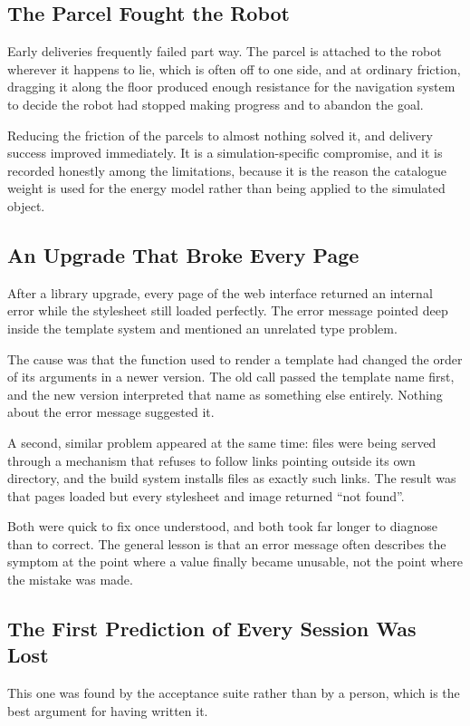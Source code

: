 \documentclass[12pt,a4paper]{report}
\begin{document}
\subsection{The Parcel Fought the Robot}
Early deliveries frequently failed part way. The parcel is attached to the robot wherever it happens
to lie, which is often off to one side, and at ordinary friction, dragging it along the floor
produced enough resistance for the navigation system to decide the robot had stopped making progress
and to abandon the goal.

Reducing the friction of the parcels to almost nothing solved it, and delivery success improved
immediately. It is a simulation-specific compromise, and it is recorded honestly among the
limitations, because it is the reason the catalogue weight is used for the energy model rather than
being applied to the simulated object.

\subsection{An Upgrade That Broke Every Page}
After a library upgrade, every page of the web interface returned an internal error while the
stylesheet still loaded perfectly. The error message pointed deep inside the template system and
mentioned an unrelated type problem.

The cause was that the function used to render a template had changed the order of its arguments in
a newer version. The old call passed the template name first, and the new version interpreted that
name as something else entirely. Nothing about the error message suggested it.

A second, similar problem appeared at the same time: files were being served through a mechanism
that refuses to follow links pointing outside its own directory, and the build system installs files
as exactly such links. The result was that pages loaded but every stylesheet and image returned
``not found''.

Both were quick to fix once understood, and both took far longer to diagnose than to correct. The
general lesson is that an error message often describes the symptom at the point where a value
finally became unusable, not the point where the mistake was made.

\subsection{The First Prediction of Every Session Was Lost}
\label{sec:coldstart}
This one was found by the acceptance suite rather than by a person, which is the best argument for
having written it.
\end{document}
